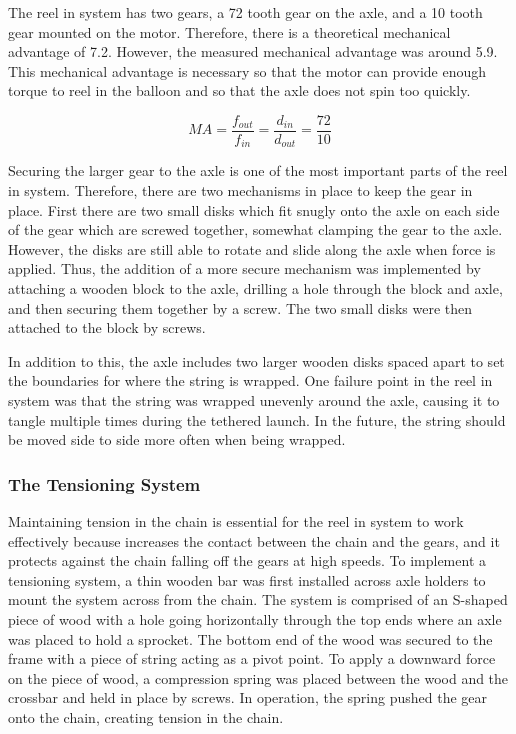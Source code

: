 \documentclass[12pt,]{article}
\begin{document}
The reel in system has two gears, a 72 tooth gear on the axle, and a 10
tooth gear mounted on the motor. Therefore, there is a theoretical
mechanical advantage of 7.2. However, the measured mechanical advantage
was around 5.9. This mechanical advantage is necessary so that the motor
can provide enough torque to reel in the balloon and so that the axle
does not spin too quickly.

\[MA = \frac{f_{out}}{f_{in}} = \frac{d_{in}}{d_{out}} = \frac{72}{10}\]

Securing the larger gear to the axle is one of the most important parts
of the reel in system. Therefore, there are two mechanisms in place to
keep the gear in place. First there are two small disks which fit snugly
onto the axle on each side of the gear which are screwed together,
somewhat clamping the gear to the axle. However, the disks are still
able to rotate and slide along the axle when force is applied. Thus, the
addition of a more secure mechanism was implemented by attaching a
wooden block to the axle, drilling a hole through the block and axle,
and then securing them together by a screw. The two small disks were
then attached to the block by screws.

In addition to this, the axle includes two larger wooden disks spaced
apart to set the boundaries for where the string is wrapped. One failure
point in the reel in system was that the string was wrapped unevenly
around the axle, causing it to tangle multiple times during the tethered
launch. In the future, the string should be moved side to side more
often when being wrapped.

\subsubsection{The Tensioning System}\label{the-tensioning-system}

Maintaining tension in the chain is essential for the reel in system to
work effectively because increases the contact between the chain and the
gears, and it protects against the chain falling off the gears at high
speeds. To implement a tensioning system, a thin wooden bar was first
installed across axle holders to mount the system across from the chain.
The system is comprised of an S-shaped piece of wood with a hole going
horizontally through the top ends where an axle was placed to hold a
sprocket. The bottom end of the wood was secured to the frame with a
piece of string acting as a pivot point. To apply a downward force on
the piece of wood, a compression spring was placed between the wood and
the crossbar and held in place by screws. In operation, the spring
pushed the gear onto the chain, creating tension in the chain.
\end{document}
